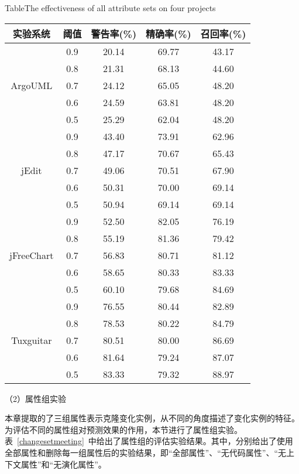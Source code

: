 \begin{table}[htbp]
{Table$\!$}{The effectiveness of all attribute sets on four projects}
\vspace{0.5em}
\centering
\wuhao
\begin{tabular}{ccccc}
\toprule[1.5pt]
{实验系统}&{阈值}&{警告率(\%)}&{精确率(\%)}&{召回率(\%)}\\
\midrule[1pt]
 \multirow{5}{*}{ArgoUML}
&0.9&	20.14&	69.77&	43.17\\
&0.8&	21.31&	68.13&	44.60\\
&0.7&	24.12&	65.05&	48.20\\
&0.6&	24.59&	63.81&	48.20\\
&0.5&	25.29&	62.04&	48.20\\
\hline
\multirow{5}{*}{jEdit}
&0.9&	43.40&	73.91&	62.96\\
&0.8&	47.17&	70.67&	65.43\\
&0.7&	49.06&	70.51&	67.90\\
&0.6&	50.31&	70.00&	69.14\\
&0.5&	50.94&	69.14&	69.14\\
\hline
\multirow{5}{*}{jFreeChart}
&0.9&	52.50&	82.05&	76.19\\
&0.8&	55.19&	81.36&	79.42\\
&0.7&	56.83&	80.71&	81.12\\
&0.6&	58.65&	80.33&	83.33\\
&0.5&	60.10&	79.68&	84.69\\
\hline
\multirow{5}{*}{Tuxguitar}
&0.9	&76.55&   80.44&	82.89\\
&0.8	&78.53&	80.22&	84.79\\
&0.7	&80.51&	80.00&	86.69\\
&0.6	&81.64&	79.24&	87.07\\
&0.5    &83.33&	79.32&	88.97\\
\bottomrule[1.5pt]
\end{tabular}
\end{table}


（2）属性组实验

本章提取的了三组属性表示克隆变化实例，从不同的角度描述了变化实例的特征。为评估不同的属性组对预测效果的作用，本节进行了属性组实验。表~\ref{changesetmeeting}~中给出了属性组的评估实验结果。其中，分别给出了使用全部属性和删除每一组属性后的实验结果，即“全部属性”、“无代码属性”、“无上下文属性”和“无演化属性”。

